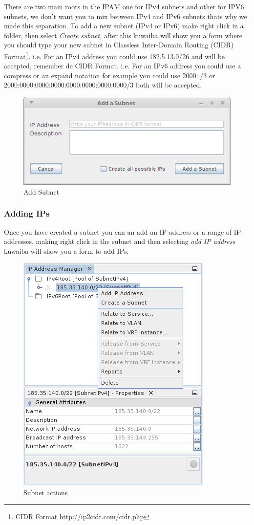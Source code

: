\documentclass[a4paper]{article}
\begin{document}
		There are two main roots in the IPAM one for IPv4 subnets and other for IPV6 subnets, we don't want you to mix between IPv4 and IPv6 subnets thats why we made this separation.  To add a new subnet (IPv4 or IPv6) make right click in a folder, then select \textit{Create subnet}, after this kuwaiba will show you a form where you should type your new subnet in Classless Inter-Domain Routing (CIDR) Format\footnote{CIDR Format http://ip2cidr.com/cidr.php}.
		\newline i.e. For an IPv4 address you could use 182.5.13.0/26 and will be accepted, remember de CIDR Format. 
		\newline i.e. For an IPv6 address you could use a compress or an expand notation for example you could use 2000::/3 or 2000:0000:0000:0000:0000:0000:0000:0000/3 both will be accepted.
		\begin{figure}[h!]
			\centering
			\includegraphics[width=0.5\linewidth]{img/ipam_add_subnet.png}
			\caption{Add Subnet}
			\label{fig:ipam_add_subnet}
		\end{figure}
		
		\subsubsection{Adding IPs}
		
		Once you have created a subnet you can an add an IP address or a range of IP addresses, making right click in the subnet and then selecting \textit{add IP address} kuwaiba will show you a form to add IPs.
		\begin{figure}[h!]
			\centering
			\includegraphics[width=0.4\linewidth]{img/ipam_subnet_actions.png}
			\caption{Subnet actions}
			\label{fig:ipam_subnet_actions}
		\end{figure}
		
\end{document}
